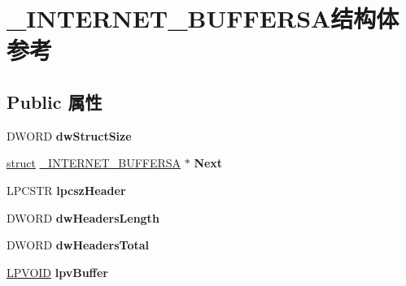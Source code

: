 \hypertarget{struct___i_n_t_e_r_n_e_t___b_u_f_f_e_r_s_a}{}\section{\+\_\+\+I\+N\+T\+E\+R\+N\+E\+T\+\_\+\+B\+U\+F\+F\+E\+R\+S\+A结构体 参考}
\label{struct___i_n_t_e_r_n_e_t___b_u_f_f_e_r_s_a}
\subsection*{Public 属性}
\begin{DoxyCompactItemize}
\item 
\mbox{\label{struct___i_n_t_e_r_n_e_t___b_u_f_f_e_r_s_a_a2e73e09e8d8ad85b189b808719d31a8e}} 
D\+W\+O\+RD {\bfseries dw\+Struct\+Size}
\item 
\mbox{\label{struct___i_n_t_e_r_n_e_t___b_u_f_f_e_r_s_a_abf111ca24efda3a31389f08d2dd1615b}} 
\hyperlink{interfacestruct}{struct} \hyperlink{struct___i_n_t_e_r_n_e_t___b_u_f_f_e_r_s_a}{\+\_\+\+I\+N\+T\+E\+R\+N\+E\+T\+\_\+\+B\+U\+F\+F\+E\+R\+SA} $\ast$ {\bfseries Next}
\item 
\mbox{\label{struct___i_n_t_e_r_n_e_t___b_u_f_f_e_r_s_a_a36e75cd5760a42c4e6694b659db437a1}} 
L\+P\+C\+S\+TR {\bfseries lpcsz\+Header}
\item 
\mbox{\label{struct___i_n_t_e_r_n_e_t___b_u_f_f_e_r_s_a_a15fed07cb3d366d01d3c59e24164bb22}} 
D\+W\+O\+RD {\bfseries dw\+Headers\+Length}
\item 
\mbox{\label{struct___i_n_t_e_r_n_e_t___b_u_f_f_e_r_s_a_af8bd12db88729dfce67afe5b6acb4970}} 
D\+W\+O\+RD {\bfseries dw\+Headers\+Total}
\item 
\mbox{\label{struct___i_n_t_e_r_n_e_t___b_u_f_f_e_r_s_a_ad8a2a24646e7ec1101800391ad12c864}} 
\hyperlink{interfacevoid}{L\+P\+V\+O\+ID} {\bfseries lpv\+Buffer}
\item 
\mbox{\label{struct___i_n_t_e_r_n_e_t___b_u_f_f_e_r_s_a_a4a5c323ba31040d12c86b0264f446433}} 

\end{DoxyCompactItemize}

